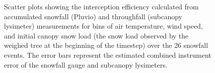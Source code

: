 \documentclass[
  letterpaper,
  DIV=11,
  numbers=noendperiod]{scrartcl}
\begin{document}
\begin{figure}[H]


\caption{\label{fig-scl-ip-bins}Scatter plots showing the interception
efficiency calculated from accumulated snowfall (Pluvio) and throughfall
(subcanopy lysimeter) measurements for bins of air temperature, wind
speed, and initial canopy snow load (the snow load observed by the
weighed tree at the beginning of the timestep) over the 26 snowfall
events. The error bars represent the estimated combined instrument error
of the snowfall gauge and subcanopy lysimeters.}

\end{figure}%
\end{document}
